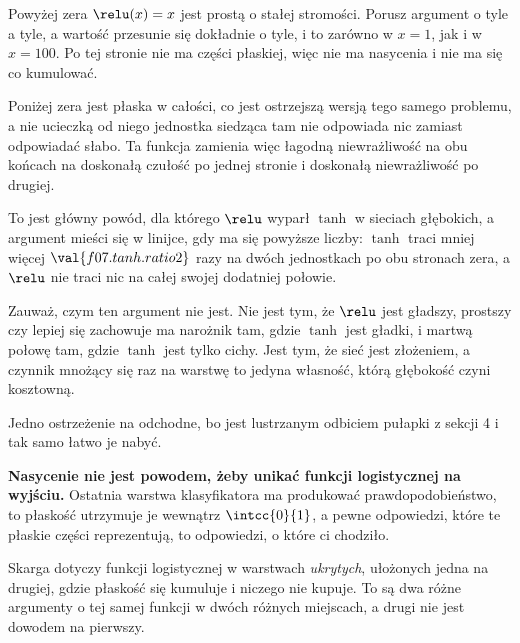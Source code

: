 \begin{fr}
Powyżej zera $\relu(x) = x$ jest prostą o stałej stromości. Porusz argument o
tyle a tyle, a wartość przesunie się dokładnie o tyle, i to zarówno w $x = 1$,
jak i w $x = 100$. Po tej stronie nie ma części płaskiej, więc nie ma
nasycenia i nie ma się co kumulować.

Poniżej zera jest płaska w całości, co jest ostrzejszą wersją tego samego
problemu, a nie ucieczką od niego \dash{} jednostka siedząca tam nie
odpowiada nic zamiast odpowiadać słabo. Ta funkcja zamienia więc łagodną
niewrażliwość na obu końcach na doskonałą czułość po jednej stronie i
doskonałą niewrażliwość po drugiej.

\begin{aibox}
To jest główny powód, dla którego $\relu$ wyparł $\tanh$ w sieciach
głębokich, a argument mieści się w linijce, gdy ma się powyższe liczby:
$\tanh$ traci mniej więcej $\val{f07.tanh.ratio2}$ razy na dwóch jednostkach
po obu stronach zera, a $\relu$ nie traci nic na całej swojej dodatniej
połowie.

Zauważ, czym ten argument nie jest. Nie jest tym, że $\relu$ jest gładszy,
prostszy czy lepiej się zachowuje \dash{} ma narożnik tam, gdzie $\tanh$ jest
gładki, i martwą połowę tam, gdzie $\tanh$ jest tylko cichy. Jest tym, że sieć
jest złożeniem, a czynnik mnożący się raz na warstwę to jedyna własność, którą
głębokość czyni kosztowną.
\end{aibox}
\end{fr}

\begin{fr}
Jedno ostrzeżenie na odchodne, bo jest lustrzanym odbiciem pułapki z sekcji 4
i tak samo łatwo je nabyć.

\textbf{Nasycenie nie jest powodem, żeby unikać funkcji logistycznej na
wyjściu.} Ostatnia warstwa klasyfikatora ma produkować prawdopodobieństwo, to
płaskość utrzymuje je wewnątrz $\intcc{0}{1}$, a pewne odpowiedzi, które te
płaskie części reprezentują, to odpowiedzi, o które ci chodziło.

Skarga dotyczy funkcji logistycznej w warstwach \emph{ukrytych}, ułożonych
jedna na drugiej, gdzie płaskość się kumuluje i niczego nie kupuje. To są dwa
różne argumenty o tej samej funkcji w dwóch różnych miejscach, a drugi nie
jest dowodem na pierwszy.
\end{fr}


